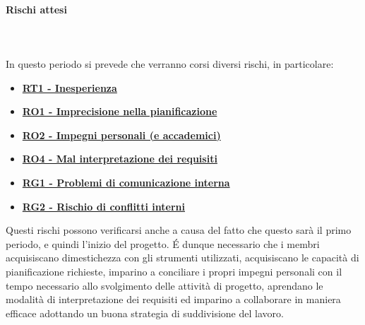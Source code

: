 \paragraph{Rischi attesi} \hspace{1cm}
\\ \hspace{1cm} \\
In questo periodo si prevede che verranno corsi diversi rischi, in particolare:
\begin{itemize}
    \item \textbf{\hyperlink{RT1}{RT1 - Inesperienza}}
    \item \textbf{\hyperlink{RO1}{RO1 - Imprecisione nella pianificazione}}
    \item \textbf{\hyperlink{RO2}{RO2 - Impegni personali (e accademici)}}
    \item \textbf{\hyperlink{RO4}{RO4 - Mal interpretazione dei requisiti}}
    \item \textbf{\hyperlink{RG1}{RG1 - Problemi di comunicazione interna}}
    \item \textbf{\hyperlink{RG2}{RG2 - Rischio di conflitti interni}}
\end{itemize}
Questi rischi possono verificarsi anche a causa del fatto che questo sarà il primo periodo, e quindi l'inizio del progetto. \'E dunque necessario che i membri acquisiscano dimestichezza con gli strumenti utilizzati, acquisiscano le capacità di pianificazione richieste, imparino a conciliare i propri impegni personali con il tempo necessario allo svolgimento delle attività di progetto, aprendano le modalità di interpretazione dei requisiti ed imparino a collaborare in maniera efficace adottando un buona strategia di suddivisione del lavoro.
